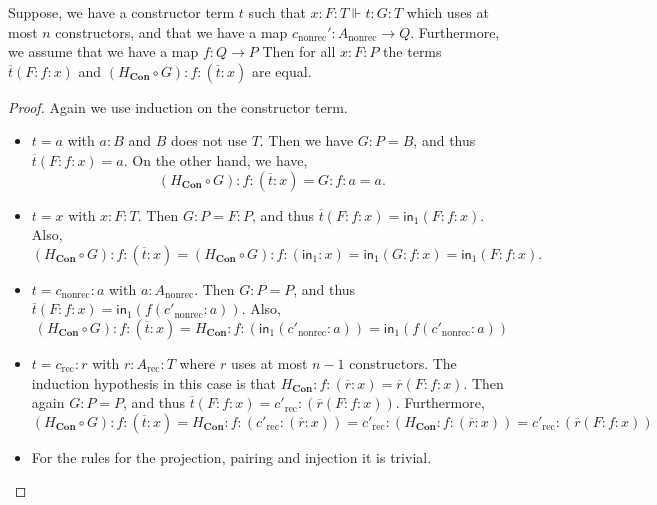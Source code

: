 \documentclass[a4paper,UKenglish]{lipics-v2016}
\newcommand{\Boperator}[1]{\mathsf{#1}}
\newcommand{\inn}{\Boperator{in}}
\newcommand{\rec}[0]{\operatorname{rec}}
\newcommand{\nonrec}[0]{\operatorname{nonrec}}
\newcommand{\Con}[0]{\textbf{Con}}
\begin{document}
\begin{lemma}
\label{lem:constrCoh}
Suppose, we have a constructor term $t$ such that $x : F : T \Vdash t : G : T$ which uses at most $n$ constructors, and that we have a map $c_{\nonrec}' : A_{\nonrec} \rightarrow Q$.
Furthermore, we assume that we have a map $f : Q \rightarrow P$
Then for all $x : F : P$ the terms $\overline{t}(F : f : x)$ and $(H_{\Con} \circ G) : f : (\overline{t} : x)$ are equal.
\end{lemma}

\begin{proof}
Again we use induction on the constructor term.
\begin{itemize}
        \item $t = a$ with $a : B$ and $B$ does not use $T$. 
        Then we have $G : P = B$, and thus 
        $
        \overline{t}(F : f : x) = a.
        $
        On the other hand, we have, 
        \[
        (H_{\Con} \circ G) : f : (\overline{t} : x) = G : f : a = a.
        \]
        \item $t = x$ with $x : F : T$. 
        Then $G : P = F : P$, and thus
        $
        \overline{t}(F : f : x) = \inn_1(F : f : x).
        $
        Also,
        \[
        (H_{\Con} \circ G) : f : (\overline{t} : x) = (H_{\Con} \circ G) : f : (\inn_1 : x) = \inn_1(G : f : x) = \inn_1(F : f : x).
        \]
        \item $t = c_{\nonrec} : a$ with $a : A_{\nonrec}$. 
        Then $G : P = P$, and thus
        $
        \overline{t}(F : f : x) = \inn_1(f(c'_{\nonrec} : a))
        $.
        Also,
        \[
        (H_{\Con} \circ G) : f : (\overline{t} : x) = H_{\Con} : f : (\inn_1(c'_{\nonrec} : a)) = \inn_1(f(c'_{\nonrec} : a))
        \]
        \item $t = c_{\rec} : r$ with $r : A_{\rec} : T$ where $r$ uses at most $n-1$ constructors. 
        The induction hypothesis in this case is that $H_{\Con} : f : (\overline{r} : x) = \overline{r}(F : f : x)$.
        Then again $G : P = P$, and thus
        $
        \overline{t}(F : f : x) = c'_{\rec} : (\overline{r}(F : f : x))
        $.
        Furthermore,
        \[
        (H_{\Con} \circ G) : f : (\overline{t} : x) = H_{\Con} : f : (c'_{\rec} : (\overline{r} : x)) = c'_{\rec} : (H_{\Con} : f : (\overline{r} : x)) = c'_{\rec} : (\overline{r}(F : f : x))
        \]
        \item For the rules for the projection, pairing and injection it is trivial. \qedhere
\end{itemize}
\end{proof}
\end{document}
